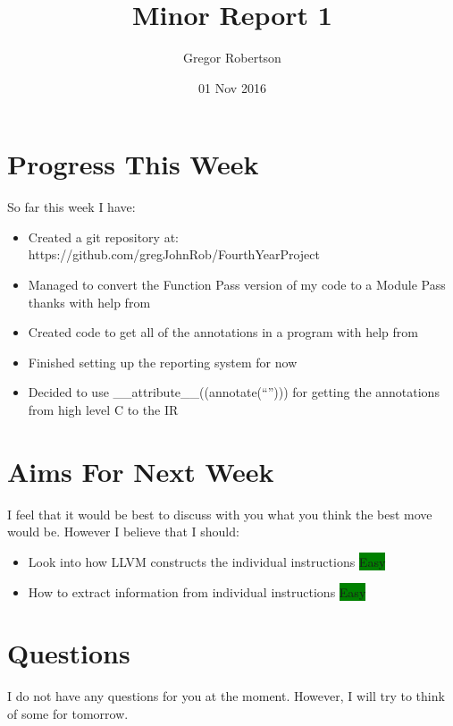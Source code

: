\documentclass{article}
\title{Minor Report 1}
\author{Gregor Robertson}
\date{01 Nov 2016}
\begin{document}
 
\maketitle
 
\section*{Progress This Week}
So far this week I have:
\begin{itemize}
	\item Created a git repository at: https://github.com/gregJohnRob/FourthYearProject
	\item Managed to convert the Function Pass version of my code to a Module Pass thanks with help from \cite{ModulePassError}
	\item Created code to get all of the annotations in a program with help from \cite{getAnnotations}
	\item Finished setting up the reporting system for now
	\item Decided to use \_\_attribute\_\_((annotate(``''))) for getting the annotations from high level C to the IR
\end{itemize}

\section*{Aims For Next Week}
I feel that it would be best to discuss with you what you think the best move would be. However I believe that I should:
\begin{itemize}
	\item Look into how LLVM constructs the individual instructions \colorbox{Green}{\color{Black}Easy}
	\item How to extract information from individual instructions \colorbox{Green}{\color{Black}Easy}
\end{itemize}

\section*{Questions}
I do not have any questions for you at the moment. However, I will try to think of some for tomorrow. 

\medskip
 
\printbibliography
\end{document}
